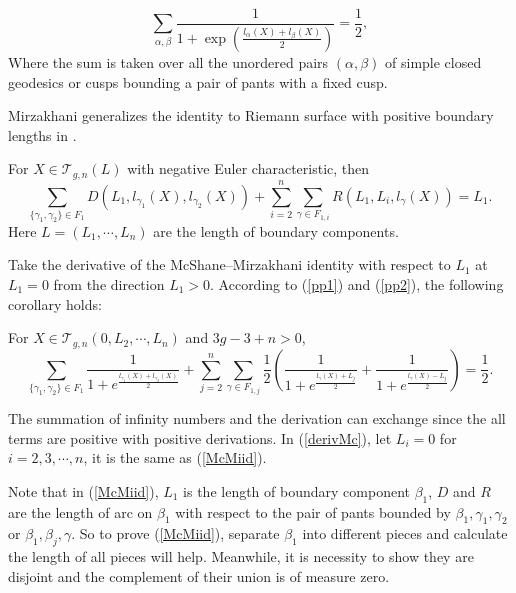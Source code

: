 \begin{theorem}\label{Mcshaneid}
\begin{equation}\label{Mcshaneidorig}
    \sum_{\alpha,\beta}\frac{1}{1+\exp\left(\frac{l_\alpha(X)+l_\beta(X)}{2}\right)}=\frac{1}{2},
\end{equation}
Where the sum is taken over all the unordered  pairs $(\alpha,\beta)$ of simple closed geodesics or cusps bounding  a pair of pants with a fixed cusp. 
\end{theorem}

Mirzakhani generalizes the identity to Riemann surface with positive boundary lengths in \cite{Mirzakhani:2006fta}. 

\begin{theorem}
For $X\in \mathscr{T}_{g,n}(L)$ with negative Euler characteristic,  then \begin{equation}\label{McMiid}
\sum_{\{\gamma_1,\gamma_2\}\in F_1}D(L_1,l_{\gamma_1} (X),l_{\gamma_2}(X))+\sum_{i=2}^n\sum_{\gamma\in  F_{1,i}}R(L_1,L_i,l_{\gamma}(X))=L_1.
\end{equation}
Here $L=(L_1,\cdots,L_n)$ are the length of boundary components.
\end{theorem}

Take the derivative of  the McShane--Mirzakhani identity with respect to $L_1$ at $L_1=0$ from the direction $L_1>0$. According to (\ref{pp1}) and (\ref{pp2}), the following corollary holds:

\begin{corollary}
For $X\in \mathscr{T}_{g,n}(0,L_2,\cdots,L_n)$ and $3g-3+n>0$,
\begin{equation}\label{derivMc}
    \sum_{\{\gamma_1,\gamma_2\}\in F_1}\frac{1}{1+e^{\frac{l_{\gamma_1}(X)+l_{\gamma_2}(X)}{2}}}+\sum_{j=2}^n\sum_{\gamma\in F_{1,j}}\frac{1}{2}\left(\frac{1}{1+e^{\frac{l_\gamma(X)+L_j}{2}}}+\frac{1}{1+e^{\frac{l_\gamma(X)-L_j}{2}}}\right)=\frac{1}{2}.
\end{equation}
\end{corollary}

\begin{remark}
The summation of infinity numbers and the derivation can exchange since the all terms are positive with positive derivations.
In (\ref{derivMc}), let $L_i=0$ for $i=2,3,\cdots,n$, it is the same as (\ref{McMiid}). 
\end{remark}

Note that in (\ref{McMiid}), $L_1$ is the length of boundary component $\beta_1$,  $D$ and $R$ are the length of arc on $\beta_1$ with respect to the pair of pants bounded by $\beta_1,\gamma_1,\gamma_2$ or $\beta_1,\beta_j,\gamma$. So to prove (\ref{McMiid}), separate $\beta_1$ into different pieces and calculate the length of all pieces will help. Meanwhile, it is necessity to show they are disjoint and the complement of their union is of measure zero.

